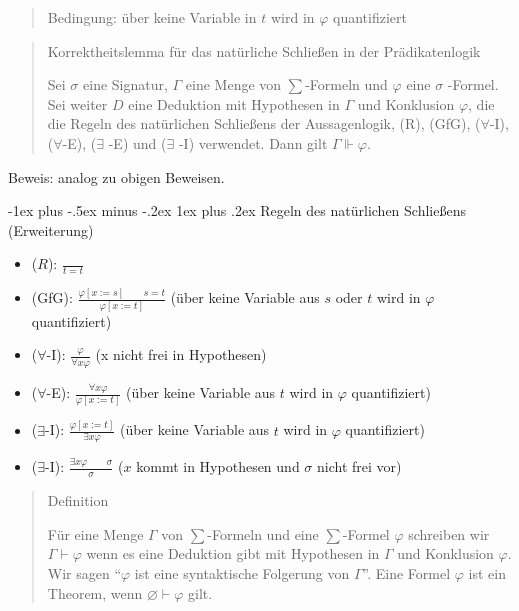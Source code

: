 \documentclass[a4paper]{article}
\makeatletter
\renewcommand{\subsubsection}{\@startsection{subsubsection}{3}{0mm}%
                {-1ex plus -.5ex minus -.2ex}%
                {1ex plus .2ex}%
                {\normalfont\small\bfseries}}
\makeatother
\begin{document}
\begin{multicols}{3}
\begin{quote}
    Bedingung: über keine Variable in $t$ wird in $\varphi$ quantifiziert
  \end{quote}

  \begin{quote}
    Korrektheitslemma für das natürliche Schließen in der Prädikatenlogik

    Sei $\sigma$ eine Signatur, $\Gamma$ eine Menge von $\sum$-Formeln und
    $\varphi$ eine $\sigma$ -Formel. Sei weiter $D$ eine Deduktion mit
    Hypothesen in $\Gamma$ und Konklusion $\varphi$, die die Regeln des
    natürlichen Schließens der Aussagenlogik, (R), (GfG), ($\forall$-I),
    ($\forall$-E), ($\exists$ -E) und ($\exists$ -I) verwendet. Dann gilt
    $\Gamma\Vdash\varphi$.
  \end{quote}

  Beweis: analog zu obigen Beweisen.

  \subsubsection{Regeln des natürlichen Schließens
    (Erweiterung)}\label{regeln-des-natuxfcrlichen-schlieuxdfens-erweiterung}

  \begin{itemize}
    \itemsep1pt\parskip0pt
    \item
          ($R$): $\frac{}{t=t}$
    \item
          (GfG): $\frac{\varphi[x:=s] \quad\quad s=t}{\varphi[x:=t]}$ (über
          keine Variable aus $s$ oder $t$ wird in $\varphi$ quantifiziert)
    \item
          ($\forall$-I): $\frac{\varphi}{\forall x\varphi}$ (x nicht frei in
          Hypothesen)
    \item
          ($\forall$-E): $\frac{\forall x\varphi}{\varphi[x:=t]}$ (über keine
          Variable aus $t$ wird in $\varphi$ quantifiziert)
    \item
          ($\exists$-I): $\frac{\varphi [x:=t]}{\exists x\varphi}$ (über keine
          Variable aus $t$ wird in $\varphi$ quantifiziert)
    \item
          ($\exists$-I): $\frac{\exists x\varphi\quad\quad \sigma}{\sigma}$ ($x$
          kommt in Hypothesen und $\sigma$ nicht frei vor)
  \end{itemize}

  \begin{quote}
    Definition

    Für eine Menge $\Gamma$ von $\sum$-Formeln und eine $\sum$-Formel
    $\varphi$ schreiben wir $\Gamma\vdash\varphi$ wenn es eine Deduktion
    gibt mit Hypothesen in $\Gamma$ und Konklusion $\varphi$. Wir sagen
    ``$\varphi$ ist eine syntaktische Folgerung von $\Gamma$''. Eine Formel
    $\varphi$ ist ein Theorem, wenn $\varnothing\vdash\varphi$ gilt.
  \end{quote}


\end{multicols}
\end{document}
